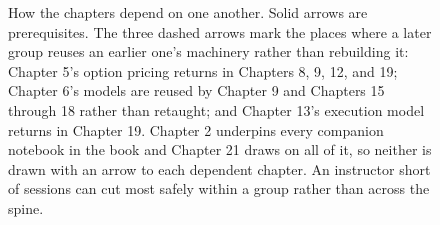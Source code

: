\begin{figure}[htbp]
\caption{How the chapters depend on one another. Solid arrows are prerequisites.
The three dashed arrows mark the places where a later group reuses an earlier
one's machinery rather than rebuilding it: Chapter 5's option pricing returns in
Chapters 8, 9, 12, and 19; Chapter 6's models are reused by Chapter 9 and
Chapters 15 through 18 rather than retaught; and Chapter 13's execution model
returns in Chapter 19. Chapter 2 underpins every companion notebook in the book
and Chapter 21 draws on all of it, so neither is drawn with an arrow to each
dependent chapter. An instructor short of sessions can cut most safely within a
group rather than across the spine.}
\label{fig:chapter-dependencies}
\end{figure}


